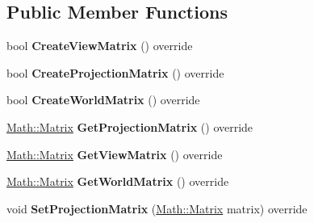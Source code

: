 \subsection*{Public Member Functions}
\begin{DoxyCompactItemize}
\item 
\hypertarget{class_jade_1_1_graphics_1_1_g_l_constant_buffer_a248bd27c22ec0bb6a0914d7c316eda43}{}bool {\bfseries Create\+View\+Matrix} () override\label{class_jade_1_1_graphics_1_1_g_l_constant_buffer_a248bd27c22ec0bb6a0914d7c316eda43}

\item 
\hypertarget{class_jade_1_1_graphics_1_1_g_l_constant_buffer_ac157f03e820e98b2b5487e55c3d8e57d}{}bool {\bfseries Create\+Projection\+Matrix} () override\label{class_jade_1_1_graphics_1_1_g_l_constant_buffer_ac157f03e820e98b2b5487e55c3d8e57d}

\item 
\hypertarget{class_jade_1_1_graphics_1_1_g_l_constant_buffer_a43f861a52e5112cc105db445bbe88600}{}bool {\bfseries Create\+World\+Matrix} () override\label{class_jade_1_1_graphics_1_1_g_l_constant_buffer_a43f861a52e5112cc105db445bbe88600}

\item 
\hypertarget{class_jade_1_1_graphics_1_1_g_l_constant_buffer_afdeb34f7b45223956976b31f764c5219}{}\hyperlink{struct_jade_1_1_math_1_1_matrix}{Math\+::\+Matrix} {\bfseries Get\+Projection\+Matrix} () override\label{class_jade_1_1_graphics_1_1_g_l_constant_buffer_afdeb34f7b45223956976b31f764c5219}

\item 
\hypertarget{class_jade_1_1_graphics_1_1_g_l_constant_buffer_a157d6fbeb07de79f61849487fe5ce083}{}\hyperlink{struct_jade_1_1_math_1_1_matrix}{Math\+::\+Matrix} {\bfseries Get\+View\+Matrix} () override\label{class_jade_1_1_graphics_1_1_g_l_constant_buffer_a157d6fbeb07de79f61849487fe5ce083}

\item 
\hypertarget{class_jade_1_1_graphics_1_1_g_l_constant_buffer_aefbb9b1883f7291bfa7bf6dbfc8afdca}{}\hyperlink{struct_jade_1_1_math_1_1_matrix}{Math\+::\+Matrix} {\bfseries Get\+World\+Matrix} () override\label{class_jade_1_1_graphics_1_1_g_l_constant_buffer_aefbb9b1883f7291bfa7bf6dbfc8afdca}

\item 
\hypertarget{class_jade_1_1_graphics_1_1_g_l_constant_buffer_a3c71669d4a5c5e322fa79136418bdd2d}{}void {\bfseries Set\+Projection\+Matrix} (\hyperlink{struct_jade_1_1_math_1_1_matrix}{Math\+::\+Matrix} matrix) override\label{class_jade_1_1_graphics_1_1_g_l_constant_buffer_a3c71669d4a5c5e322fa79136418bdd2d}


\end{DoxyCompactItemize}
